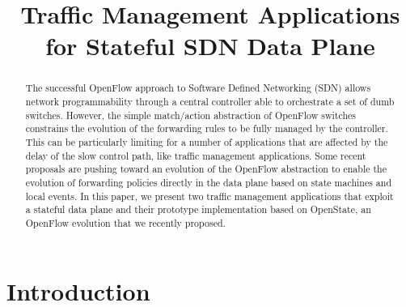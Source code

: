 \documentclass[10pt,conference]{IEEEtran}
\begin{document}
\title{Traffic Management Applications \\ for Stateful SDN Data Plane}

\author{
}

\maketitle

\begin{abstract}
The successful OpenFlow approach to Software Defined Networking (SDN) allows network programmability through a central controller able to orchestrate a set of dumb switches. However, the simple match/action abstraction of OpenFlow switches constrains the evolution of the forwarding rules to be fully managed by the controller. This can be particularly limiting for a number of applications that are affected by the delay of the slow control path, like traffic management applications. Some recent proposals are pushing toward an evolution of the OpenFlow abstraction to enable the evolution of forwarding policies directly in the data plane based on state machines and local events. In this paper, we present two traffic management applications that exploit a stateful data plane and their prototype implementation based on OpenState, an OpenFlow evolution that we recently proposed.
\end{abstract}

\section{Introduction}
\label{sec:introduction}
\end{document}
